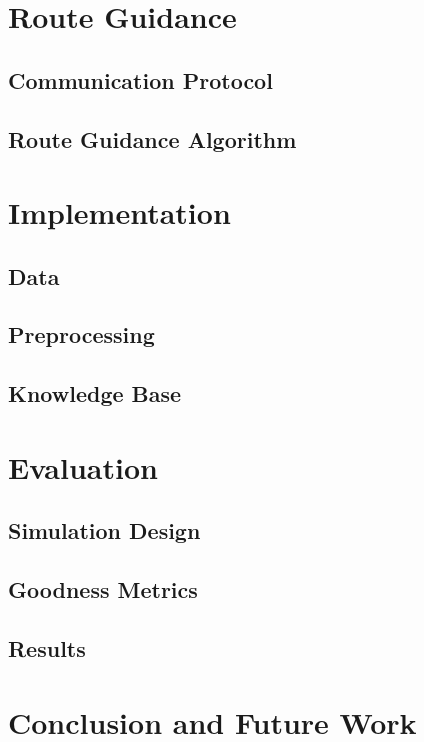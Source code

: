 \documentclass{iitkthesis}
\begin{document}
 \chapter{Route Guidance}
 \section{Communication Protocol}
 \section{Route Guidance Algorithm}
 \chapter{Implementation}
 \section{Data}
 \section{Preprocessing}
 \section{Knowledge Base}
 \chapter{Evaluation}
 \section{Simulation Design}
 \section{Goodness Metrics}
 \section{Results}
 \chapter{Conclusion and Future Work}


\end{document}

